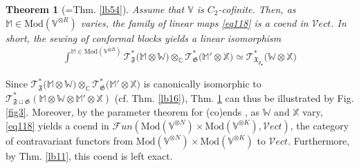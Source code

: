 \documentclass[11pt,b5paper,notitlepage]{article}
\theoremstyle{definition}
\theoremstyle{plain}
\newtheorem{thm}[df]{Theorem}
\newcommand{\mc}{\mathcal}
\newcommand{\Vect}{\mathcal Vect}
\newcommand{\blt}{\bullet}
\newcommand{\Vbb}{\mathbb V}
\newcommand{\Xbb}{\mathbb X}
\newcommand{\Wbb}{\mathbb W}
\newcommand{\Mbb}{\mathbb M}
\newcommand{\Cbb}{\mathbb C}
\newcommand{\<}{\left\langle}
\renewcommand{\>}{\right\rangle}
\newcommand{\fx}{\mathfrak{X}}
\newcommand{\ST}{\mathscr{T}}
\newcommand{\Mod}{\mathrm{Mod}}
\newcommand{\ff}{\mathfrak{F}}
\newcommand{\fg}{\mathfrak{G}}
\numberwithin{equation}{section}
\begin{document}
\begin{thm}[=Thm. \ref{lb54}]\label{lb58}
Assume that $\Vbb$ is $C_2$-cofinite. Then, as $\Mbb\in\Mod(\Vbb^{\otimes R})$ varies, the family of linear maps \eqref{eq118} is a coend in $\Vect$. In short, the sewing of conformal blocks yields a linear isomorphism
\begin{align*}
\int^{\Mbb\in\Mod(\Vbb^{\otimes R})}\ST^*_\ff\big(\Mbb\otimes\Wbb\big)\otimes_\Cbb\ST^*_\fg\big(\Mbb'\otimes\Xbb\big)\simeq\ST_{\fx_{p_\blt}}^*\big(\Wbb\otimes \Xbb\big)
\end{align*}
\end{thm}
Since $\ST^*_\ff\big(\Mbb\otimes\Wbb\big)\otimes_\Cbb\ST^*_\fg\big(\Mbb'\otimes\Xbb\big)$ is canonically isomorphic to $\ST^*_{\ff\sqcup\fg}(\Mbb\otimes\Wbb\otimes\Mbb'\otimes\Xbb)$ (cf. Thm. \ref{lb16}), Thm. \ref{lb58} can thus be illustrated by Fig. \ref{fig3}. Moreover, by the parameter theorem for (co)ends \cite[Sec. IX.7]{MacLane-Cat}, as $\Wbb$ and $\Xbb$ vary, \eqref{eq118} yields a coend in $\mc Fun(\Mod(\Vbb^{\otimes N})\times\Mod(\Vbb^{\otimes K}),\Vect)$, the category of contravariant functors from $\Mod(\Vbb^{\otimes N})\times\Mod(\Vbb^{\otimes K})$ to $\Vect$. Furthermore, by Thm. \ref{lb11}, this coend is left exact.
\end{document}
